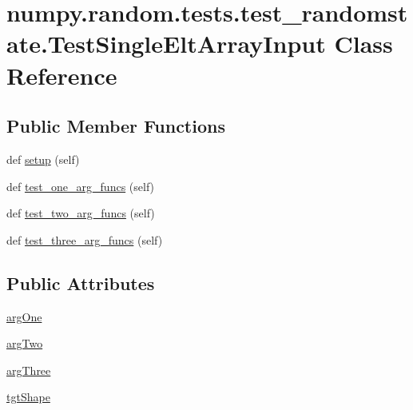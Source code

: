 \hypertarget{classnumpy_1_1random_1_1tests_1_1test__randomstate_1_1TestSingleEltArrayInput}{}\section{numpy.\+random.\+tests.\+test\+\_\+randomstate.\+Test\+Single\+Elt\+Array\+Input Class Reference}
\label{classnumpy_1_1random_1_1tests_1_1test__randomstate_1_1TestSingleEltArrayInput}
\subsection*{Public Member Functions}
\begin{DoxyCompactItemize}
\item 
def \hyperlink{classnumpy_1_1random_1_1tests_1_1test__randomstate_1_1TestSingleEltArrayInput_a3f2c873b3bbac4c9092174ed204ebfd0}{setup} (self)
\item 
def \hyperlink{classnumpy_1_1random_1_1tests_1_1test__randomstate_1_1TestSingleEltArrayInput_a24d30ac412491601fd23f512a4a0e72a}{test\+\_\+one\+\_\+arg\+\_\+funcs} (self)
\item 
def \hyperlink{classnumpy_1_1random_1_1tests_1_1test__randomstate_1_1TestSingleEltArrayInput_a4f752297f2b05a5ecb4a9bd40a640c41}{test\+\_\+two\+\_\+arg\+\_\+funcs} (self)
\item 
def \hyperlink{classnumpy_1_1random_1_1tests_1_1test__randomstate_1_1TestSingleEltArrayInput_aa82293aee77e21d94b210c46cf980ce7}{test\+\_\+three\+\_\+arg\+\_\+funcs} (self)
\end{DoxyCompactItemize}
\subsection*{Public Attributes}
\begin{DoxyCompactItemize}
\item 
\hyperlink{classnumpy_1_1random_1_1tests_1_1test__randomstate_1_1TestSingleEltArrayInput_ae208ef335eeeb2b61d41fc8b29450d2a}{arg\+One}
\item 
\hyperlink{classnumpy_1_1random_1_1tests_1_1test__randomstate_1_1TestSingleEltArrayInput_a20b554a57740b6965f8a104320615e33}{arg\+Two}
\item 
\hyperlink{classnumpy_1_1random_1_1tests_1_1test__randomstate_1_1TestSingleEltArrayInput_ac9d634e17e31e9d763c7659344008528}{arg\+Three}
\item 
\hyperlink{classnumpy_1_1random_1_1tests_1_1test__randomstate_1_1TestSingleEltArrayInput_a68783ed21979f20df20cd953a8e3f984}{tgt\+Shape}
\end{DoxyCompactItemize}


